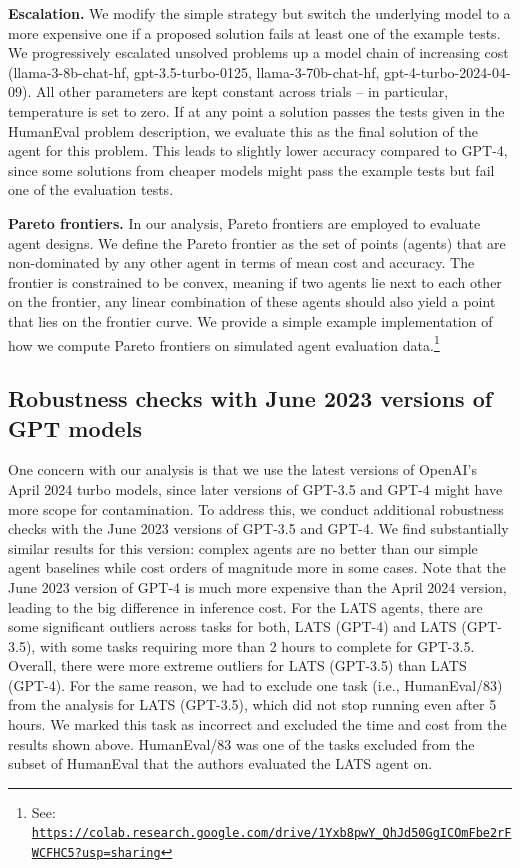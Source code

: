 \documentclass{article}
\begin{document}
\textbf{Escalation.} We modify the simple strategy but switch the underlying model to a more expensive one if a proposed solution fails at least one of the example tests. We progressively escalated unsolved problems up a model chain of increasing cost (llama-3-8b-chat-hf, gpt-3.5-turbo-0125, llama-3-70b-chat-hf, gpt-4-turbo-2024-04-09). All other parameters are kept constant across trials – in particular, temperature is set to zero. If at any point a solution passes the tests given in the HumanEval problem description, we evaluate this as the final solution of the agent for this problem. This leads to slightly lower accuracy compared to GPT-4, since some solutions from cheaper models might pass the example tests but fail one of the evaluation tests.

\textbf{Pareto frontiers.} In our analysis, Pareto frontiers are employed to evaluate agent designs. We define the Pareto frontier as the set of points (agents) that are non-dominated by any other agent in terms of mean cost and accuracy. The frontier is constrained to be convex, meaning if two agents lie next to each other on the frontier, any linear combination of these agents should also yield a point that lies on the frontier curve. We provide a simple example implementation of how we compute Pareto frontiers on simulated agent evaluation data.\footnote{See: \texttt{\url{https://colab.research.google.com/drive/1Yxb8pwY_QhJd50GgICOmFbe2rFWCFHC5?usp=sharing}}}


\subsection{Robustness checks with June 2023 versions of GPT models}
\label{appendix:robustness-costcontrolled}

One concern with our analysis is that we use the latest versions of OpenAI's April 2024 turbo models, since
later versions of GPT-3.5 and GPT-4 might have more scope for contamination. To address this, we conduct additional robustness checks with the June 2023 versions of GPT-3.5 and GPT-4. We find substantially similar results for this version: complex agents are no better than our simple agent baselines while cost orders of magnitude more in some cases. Note that the June 2023 version of GPT-4 is much more expensive than the April 2024 version, leading to the big difference in inference cost. For the LATS agents, there are some significant outliers across tasks for both, LATS (GPT-4) and LATS (GPT-3.5), with some tasks requiring more than 2 hours to complete for GPT-3.5. Overall, there were more extreme outliers for LATS (GPT-3.5) than LATS (GPT-4). For the same reason, we had to exclude one task (i.e., HumanEval/83) from the analysis for LATS (GPT-3.5), which did not stop running even after 5 hours. We marked this task as incorrect and excluded the time and cost from the results shown above. HumanEval/83 was one of the tasks excluded from the subset of HumanEval that the authors evaluated the LATS agent on.
\end{document}
